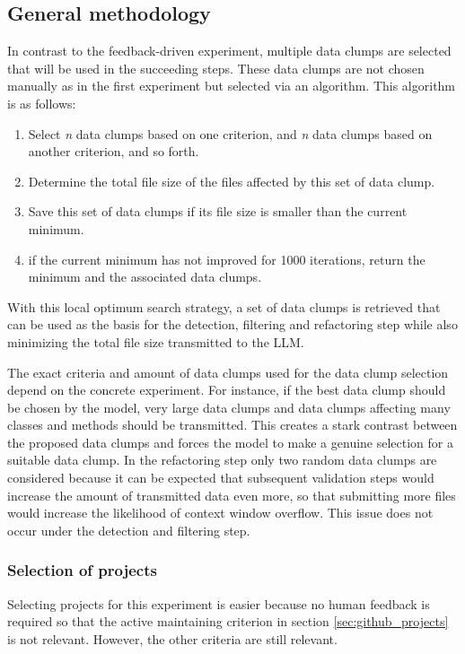 \subsection{General methodology}

In contrast to the feedback-driven experiment, multiple data clumps are selected that will be used in the succeeding steps. These data clumps are not chosen manually as in the first experiment but selected via an algorithm. This algorithm is as follows:
\begin{enumerate}
    \item Select 
\textit{n}
 data clumps based on one criterion, and 
\textit{n}
 data clumps based on another criterion, and so forth.
    \item Determine the total file size of the files affected by this set of data clump.
    \item Save this set of data clumps if its file size is smaller than the current minimum.
    \item if the current minimum has not improved for 1000 iterations, return the minimum and the associated data clumps.
\end{enumerate}

With this local optimum search strategy, a set of data clumps is retrieved that can be used as the basis for the detection, filtering and refactoring step while also minimizing the total file size transmitted to the \ac{LLM}. 

The exact criteria and amount of data clumps used for the data clump selection depend on the concrete experiment. For instance, if the best data clump should be chosen by the model, very large data clumps and data clumps affecting many classes and methods should be transmitted. This creates a stark contrast between the proposed data clumps and forces the model to make a genuine selection for a suitable data clump. In the refactoring step only two random data clumps are considered  because it can be expected that subsequent validation steps would increase the amount of transmitted data even more, so that submitting more files would increase the likelihood of context window overflow. This issue does not occur under the detection and filtering step. 

\subsubsection{Selection of projects}

Selecting projects for this experiment is easier because no human feedback is required so that the active maintaining criterion in section \ref{sec:github_projects} is not relevant. However, the other criteria are still relevant. 

